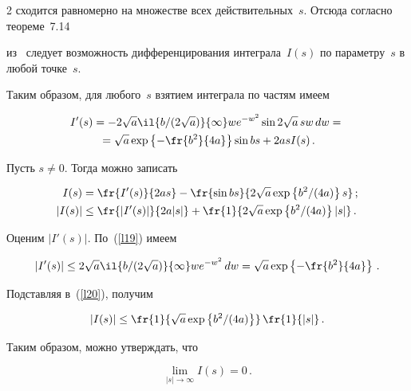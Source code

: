 \begin{multicols}{2}
сходится равномерно на множестве всех действительных~$s$. Отсюда согласно теореме~7.14 


из~\cite{matan} следует возможность дифференцирования интеграла~$I(s)$ по параметру~$s$ в любой точке~$s$. 


Таким образом, для любого~$s$ взятием интеграла по частям имеем


\begin{multline}


I'(s) = -2\sqrt{a}\il{{b}/(2\sqrt{a})}{\infty} we^{-w^2} \sin 2\sqrt{a}\,sw\,dw ={}\\


{}= \sqrt{a} \exp\left\{-\fr{b^2}{4a}\right\} \sin bs + 2asI(s)\,.


\label{l19}


\end{multline}


Пусть $s \ne 0$. Тогда можно записать


\begin{align}


I(s) &= \fr{I'(s)}{2as} - \fr{\sin bs}{2\sqrt{a}\exp\left\{{b^2}/(4a)\right\} s}\,;\notag\\


|I(s)| &\leq \fr{|I'(s)|}{2a|s|} + \fr{1}{2\sqrt{a}\exp\left\{{b^2}/(4a)\right\}|s|}\,.


\label{l20}


\end{align}


Оценим $|I'(s)|$. По~(\ref{l19}) имеем


$$


\left|I'(s)\right| \leq 2\sqrt{a}\il{{b}/(2\sqrt{a})}{\infty} we^{-w^2}\,dw = 


\sqrt{a} \exp\left\{-\fr{b^2}{4a}\right\}\,.


$$


Подставляя в~(\ref{l20}), получим


$$


\left|I(s)\right| \leq \fr{1}{\sqrt{a} \exp\left\{{b^2}/(4a)\right\}} \, \fr{1}{|s|}\,.


$$


Таким образом, можно утверждать, что


\begin{equation}


\lim_{|s|\to\infty} I(s) = 0\,.


\label{l21}


\end{equation}



\end{multicols}
